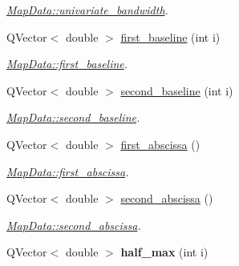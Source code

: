\begin{DoxyCompactItemize}
\begin{DoxyCompactList}\small\item\em \hyperlink{class_map_data_af54e11703d6d0d276e056fc5302b5e7c}{Map\+Data\+::univariate\+\_\+bandwidth}. \end{DoxyCompactList}\item 
Q\+Vector$<$ double $>$ \hyperlink{class_map_data_a02dfe98d659e8eac8bf8eec4c376223f}{first\+\_\+baseline} (int i)
\begin{DoxyCompactList}\small\item\em \hyperlink{class_map_data_a02dfe98d659e8eac8bf8eec4c376223f}{Map\+Data\+::first\+\_\+baseline}. \end{DoxyCompactList}\item 
Q\+Vector$<$ double $>$ \hyperlink{class_map_data_afd3efd4d5aad351c03f2a68d62deaa4a}{second\+\_\+baseline} (int i)
\begin{DoxyCompactList}\small\item\em \hyperlink{class_map_data_afd3efd4d5aad351c03f2a68d62deaa4a}{Map\+Data\+::second\+\_\+baseline}. \end{DoxyCompactList}\item 
Q\+Vector$<$ double $>$ \hyperlink{class_map_data_a6c73650238e622489f4ba5ae580e0c84}{first\+\_\+abscissa} ()
\begin{DoxyCompactList}\small\item\em \hyperlink{class_map_data_a6c73650238e622489f4ba5ae580e0c84}{Map\+Data\+::first\+\_\+abscissa}. \end{DoxyCompactList}\item 
Q\+Vector$<$ double $>$ \hyperlink{class_map_data_a16fba2ab43dd4480662a2a1d76611352}{second\+\_\+abscissa} ()
\begin{DoxyCompactList}\small\item\em \hyperlink{class_map_data_a16fba2ab43dd4480662a2a1d76611352}{Map\+Data\+::second\+\_\+abscissa}. \end{DoxyCompactList}\item 
\hypertarget{class_map_data_a534ed582acba267677828d8adee990cb}{Q\+Vector$<$ double $>$ {\bfseries half\+\_\+max} (int i)}\label{class_map_data_a534ed582acba267677828d8adee990cb}


\end{DoxyCompactItemize}
